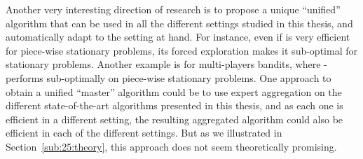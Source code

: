Another very interesting direction of research is to propose a unique ``unified'' algorithm that can be used in all the different settings studied in this thesis, and automatically adapt to the setting at hand.
For instance, even if \GLRklUCB{} is very efficient for piece-wise stationary problems, its forced exploration makes it sub-optimal for stationary problems.
Another example is for multi-players bandits, where \MCTopM-\klUCB{} performs sub-optimally on piece-wise stationary problems.
One approach to obtain a unified ``master'' algorithm could be to use expert aggregation on the different state-of-the-art algorithms presented in this thesis, and as each one is efficient in a different setting, the resulting aggregated algorithm could also be efficient in each of the different settings.
But as we illustrated in Section~\ref{sub:25:theory}, this approach does not seem theoretically promising.





